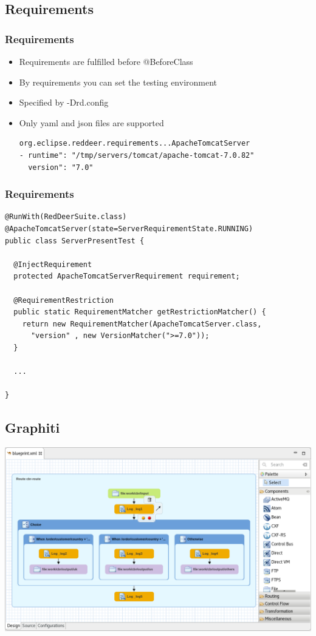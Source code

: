 \documentclass{beamer}
\begin{document}
\subsection{Requirements}
\begin{frame}[fragile]
\frametitle{Requirements}
\begin{itemize}
\item Requirements are fulfilled before @BeforeClass
\item By requirements you can set the testing environment
\item Specified by -Drd.config
\item Only yaml and json files are supported
\vspace{0.5cm}
\begin{verbatim}
org.eclipse.reddeer.requirements...ApacheTomcatServer
- runtime": "/tmp/servers/tomcat/apache-tomcat-7.0.82"
  version": "7.0"
\end{verbatim}
\end{itemize}
\end{frame}

\begin{frame}[fragile]
\frametitle{Requirements}
\begin{lstlisting}
@RunWith(RedDeerSuite.class)
@ApacheTomcatServer(state=ServerRequirementState.RUNNING)
public class ServerPresentTest {

  @InjectRequirement
  protected ApacheTomcatServerRequirement requirement;

  @RequirementRestriction
  public static RequirementMatcher getRestrictionMatcher() {
    return new RequirementMatcher(ApacheTomcatServer.class, 
      "version" , new VersionMatcher(">=7.0"));
  }

  ...

}
\end{lstlisting}
\end{frame}

\subsection{Graphiti}
\begin{frame}[fragile]
\begin{center}
\includegraphics[width=\textwidth,height=0.8\textheight,keepaspectratio]{fuse_tooling.png}
\end{center}
\end{frame}
\end{document}

